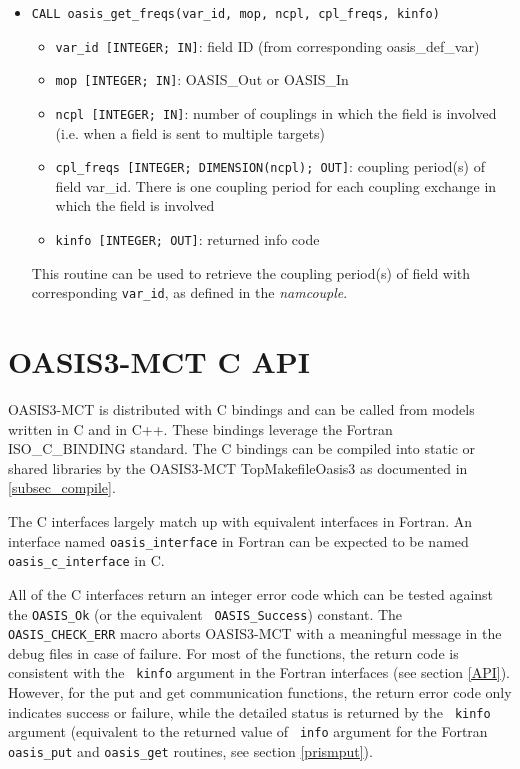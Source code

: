 \begin{itemize}
This routine returns the number of coupling exchanges in which the
field with that {\tt var\_id} is
involved. This number is needed to get the coupling frequencies with the
routine oasis\_get\_freqs, see below.


\item {\tt CALL oasis\_get\_freqs(var\_id, mop, ncpl, cpl\_freqs, kinfo)}
  \begin{itemize}
  \item {\tt var\_id [INTEGER; IN]}: field ID (from
  corresponding oasis\_def\_var)
  \item {\tt mop [INTEGER; IN]}: OASIS\_Out or OASIS\_In
  \item {\tt ncpl [INTEGER; IN]}: number of couplings in which the field
  is involved (i.e. when a field is sent to multiple targets)
   \item {\tt cpl\_freqs [INTEGER; DIMENSION(ncpl); OUT]}: coupling period(s)
  of field var\_id. There is one coupling period for
  each coupling exchange in which the field is involved
  \item {\tt kinfo [INTEGER; OUT]}: returned info code
  \end{itemize}

This routine can be used to retrieve the coupling period(s) of field with
corresponding {\tt var\_id}, as defined in the {\it namcouple}.

\end{itemize}

\section{OASIS3-MCT C API}
\label{APIC}

OASIS3-MCT is distributed with C bindings and can be called from models written
in C and in C++.  These bindings leverage the Fortran ISO\_C\_BINDING standard.
The C bindings can be compiled into static or shared libraries by the
OASIS3-MCT TopMakefileOasis3 as documented in \ref{subsec_compile}.

The C interfaces largely match
up with equivalent interfaces in Fortran.  An interface named
{\tt oasis\_interface} in Fortran can be expected to be named
{\tt oasis\_c\_interface} in C.

All of the C interfaces return an integer error code which can be
tested against the {\tt OASIS\_Ok} (or the equivalent {\tt
  OASIS\_Success}) constant.
The {\tt OASIS\_CHECK\_ERR} macro aborts
OASIS3-MCT with a meaningful message in the debug files in case of failure.
For most of the functions,
the return code is consistent with the {\tt
  kinfo} argument in the Fortran interfaces (see section \ref{API}). However, for the put and get communication functions, the return error code only indicates
success or failure, while the detailed status is returned by the {\tt
  kinfo} argument (equivalent to the returned value of {\tt
  info} argument for the Fortran {\tt oasis\_put} and {\tt oasis\_get} routines, see section \ref{prismput}).

